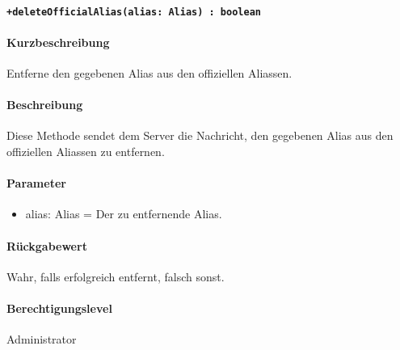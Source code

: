 \paragraph{\texttt{+deleteOfficialAlias(alias: Alias) : boolean}}%
\paragraph*{Kurzbeschreibung}
Entferne den gegebenen Alias aus den offiziellen Aliassen.
\paragraph*{Beschreibung}
Diese Methode sendet dem Server die Nachricht, den gegebenen Alias aus den offiziellen Aliassen zu entfernen.
\paragraph*{Parameter}
\begin{itemize}
    \item alias: Alias = Der zu entfernende Alias.
\end{itemize}
\paragraph*{Rückgabewert}
Wahr, falls erfolgreich entfernt, falsch sonst.
\paragraph*{Berechtigungslevel}
Administrator